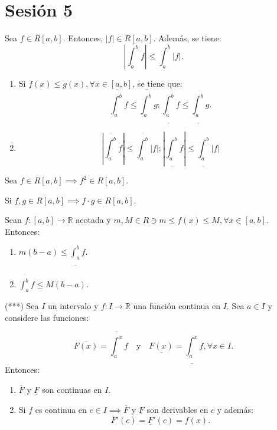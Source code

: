 \section{Sesión 5}

\begin{prop}
	Sea $f\in R[a,b]$. Entonces, $|f| \in R[a,b]$. Además, se tiene: 
	$$\left|\int_a^b f \right|\leq \int_a^b |f|.$$
\end{prop}

\begin{nota}
	\begin{enumerate}
		\item Si $f(x)\leq g(x),\forall x\in [a,b]$, se tiene que: $$\overline{\int_a^b }f\leq \overline{\int_a^b} g; \underline{\int_a^b }f\leq \underline{\int_a^b}g.$$
		\item $$\left|\overline{\int_a^b}f\right|\leq \overline{\int_a^b}|f|;\left|\underline{\int_a^b}f\right|\leq \underline{\int_a^b}|f| $$
	\end{enumerate}
\end{nota}

\begin{prop}
	Sea $f\in R[a,b]\implies f^2\in R[a,b]$. 
\end{prop}

\begin{teorema}
	Si $f, g\in R[a,b]\implies f\cdot g \in R[a,b]$. 
\end{teorema}

\begin{prop}
	Sean $f:[a,b]\to \mathbb{R}$ acotada y $m,M\in R\ni m\leq f(x)\leq M, \forall x\in [a,b]$. Entonces: 
	\begin{enumerate}
		\item $m(b-a)\leq \underline{\int_a^b}f$.
		\item $\overline{\int_a^b}f\leq M(b-a)$.
	\end{enumerate}
\end{prop}

\begin{teorema}(***)
	Sea $I$ un intervalo y $f:I\to \mathbb{R}$ una función continua en $I$. Sea $a\in I$ y considere las funciones: 
	
	$$\overline{F(x)}=\overline{\int_a^x}f \quad \text{y} \quad \underline{F(x)}=\underline{\int_a^x}f,\forall x\in I.$$
	Entonces: 
	\begin{enumerate}
		\item $\overline{F}$ y $\underline{F}$ son continuas en $I$. 
		\item Si $f$ es continua en $c\in I\implies \overline{F}$ y $\underline{F}$ son derivables en $c$ y además: 
		$$\overline{F}'(c)=\underline{F}'(c)=f(x).$$
	\end{enumerate}
\end{teorema}

